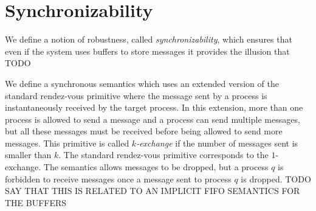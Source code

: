 \section{Synchronizability}

We define a notion of robustness, called \emph{synchronizability}, which ensures that even if the system uses buffers to store messages it provides the illusion that TODO

We define a synchronous semantics which uses an extended version of the standard rendez-vous primitive where the message sent by a process is instantaneously received by the target process. In this extension, more than one process is allowed to send a message and a process can send multiple messages, but all these messages must be received before being allowed to send more messages. This  primitive is called \emph{$k$-exchange} if the number of messages sent is smaller than $k$. The standard rendez-vous primitive corresponds to the $1$-exchange. 
The semantics allows messages to be dropped, but a process $q$ is forbidden to receive messages once a message sent to process $q$ is dropped. TODO SAY THAT THIS IS RELATED TO AN IMPLICIT FIFO SEMANTICS FOR THE BUFFERS

